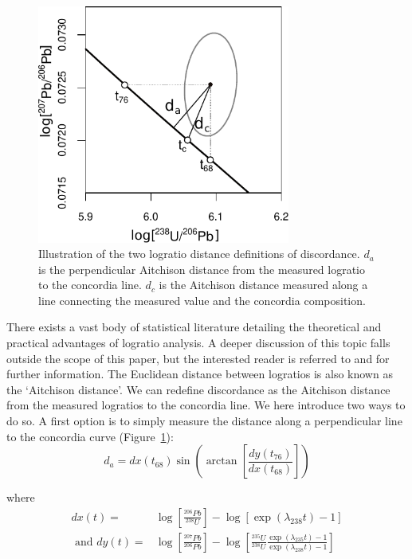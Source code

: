 \documentclass[gchron, manuscript]{copernicus}
\begin{document}
\begin{figure}
  \includegraphics[width=8.3cm]{Aitchison.pdf}
  \caption{Illustration of the two logratio distance definitions of
    discordance. $d_a$ is the perpendicular Aitchison distance from
    the measured logratio to the concordia line. $d_c$ is the
    Aitchison distance measured along a line connecting the measured
    value and the concordia composition.
  }
  \label{fig:aitchison}
\end{figure}

There exists a vast body of statistical literature detailing the
theoretical and practical advantages of logratio analysis. A deeper
discussion of this topic falls outside the scope of this paper, but
the interested reader is referred to \citet{aitchison1986} and
\citet{pawlowsky2015} for further information. The Euclidean distance
between logratios is also known as the `Aitchison distance'.  We can
redefine discordance as the Aitchison distance from the measured
logratios to the concordia line. We here introduce two ways to do so.
A first option is to simply measure the distance along a perpendicular
line to the concordia curve (Figure~\ref{fig:aitchison}):
\begin{equation}
  d_{a} = dx(t_{68})
  \sin\!\left(\arctan\!\left[ \frac{dy(t_{76})}{dx(t_{68})} \right]
  \right)
  \label{eq:dperp}
\end{equation}

\noindent where
\begin{equation}
\begin{split}
  dx(t)  = & \log\!\left[\frac{{}^{206}Pb}{{}^{238}U}\right]-
  \log\!\left[\exp(\lambda_{238} t)-1\right] \\
  \mbox{~and~}
  dy(t) = & \log\!\left[\frac{{}^{207}Pb}{{}^{206}Pb}\right] -
      \log\!\left[\frac{{}^{235}U}{{}^{238}U}
        \frac{\exp(\lambda_{235}t)-1}{\exp(\lambda_{238}t)-1}
        \right]
  \end{split}
\end{equation}
\end{document}
